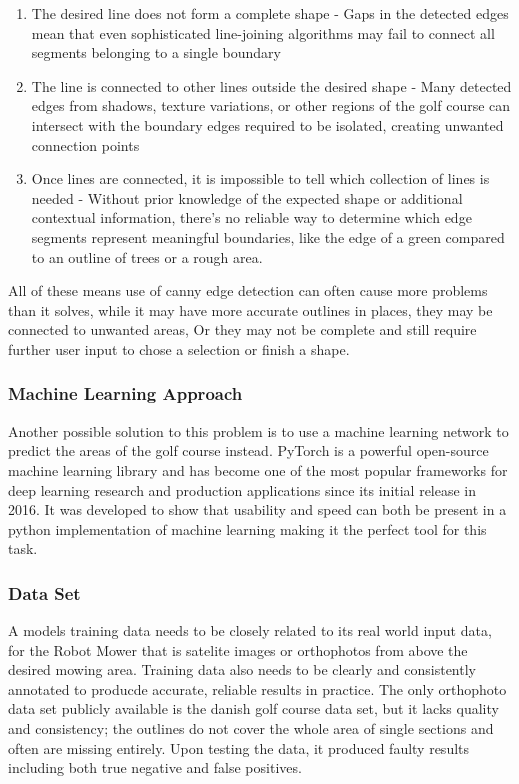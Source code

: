 \documentclass[final]{cmpreport_02}
\begin{document}
\begin{enumerate}
	\item The desired line does not form a complete shape - Gaps in the detected edges mean that even sophisticated line-joining algorithms may fail to connect all segments belonging to a single boundary

	\item The line is connected to other lines outside the desired shape - Many detected edges from shadows, texture variations, or other regions of the golf course can intersect with the boundary edges required to be isolated, creating unwanted connection points

	\item Once lines are connected, it is impossible to tell which collection of lines is needed - Without prior knowledge of the expected shape or additional contextual information, there's no reliable way to determine which edge segments represent meaningful boundaries, like the edge of a green compared to an outline of trees or a rough area.
\end{enumerate}
All of these means use of canny edge detection can often cause more problems than it solves, while it may have more accurate outlines in places, they may be connected to unwanted areas, Or they may not be complete and still require further user input to chose a selection or finish a shape.

\subsubsection{Machine Learning Approach}
Another possible solution to this problem is to use a machine learning network to predict the areas of the golf course instead.
PyTorch \citep{paszke2019pytorch} is a powerful open-source machine learning library and has become one of the most popular frameworks for deep learning research and production applications since its initial release in 2016.
It was developed to show that usability and speed can both be present in a python implementation of machine learning making it the perfect tool for this task.

\subsubsection{Data Set}
A models training data needs to be closely related to its real world input data, for the Robot Mower that is satelite images or orthophotos from above the desired mowing area.
Training data also needs to be clearly and consistently annotated to producde accurate, reliable results in practice.
The only orthophoto data set publicly available is the danish golf course data set, but it lacks quality and consistency; the outlines do not cover the whole area of single sections and often are missing entirely.
Upon testing the data, it produced faulty results including both true negative and false positives. ~
\end{document}
